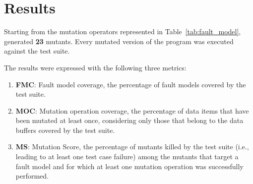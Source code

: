 
\chapter{Results}


Starting from the mutation operators represented in Table~\ref{tab:fault_model}, \DAMA generated \textbf{23} mutants. Every mutated version of the program was executed against the \case test suite.

The results were expressed with the following three metrics:
\begin{enumerate}
\item \textbf{FMC}: Fault model coverage, the percentage of fault models covered by the test suite.
\item \textbf{MOC}: Mutation operation coverage, the percentage of data items that have been mutated at least once, considering only those that belong to the data buffers covered by the test suite.
\item \textbf{MS}: Mutation Score, the percentage of mutants killed by the test suite (i.e., leading to at least one test case failure) among the mutants that target a fault model and for which at least one mutation operation was successfully performed.
\end{enumerate}

